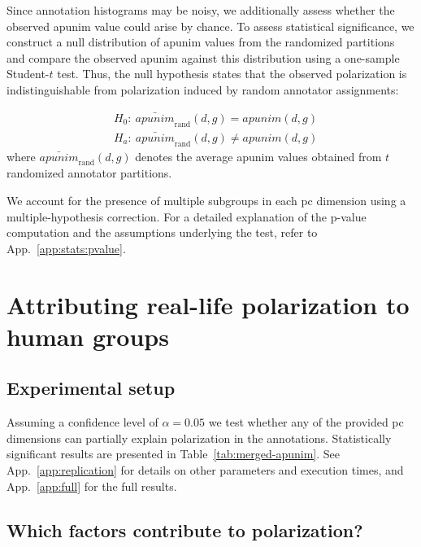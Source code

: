 \documentclass[11pt]{article}
\theoremstyle{definition}
\theoremstyle{plain}
\begin{document}
Since annotation histograms may be noisy, we additionally assess whether the observed apunim value could arise by chance. To assess statistical significance, we construct a null distribution of apunim values from the randomized partitions and compare the observed apunim against this distribution using a one-sample Student-\(t\) test. Thus, the null hypothesis states that the observed polarization is indistinguishable from polarization induced by random annotator assignments:

\begin{equation}
	\label{eq:pvalue}
	\begin{split}
		&H_0:\ 
		\bar{\textit{apunim}}_{\mathrm{rand}}(d,g)
		=
		\textit{apunim}(d,g) \\
		&H_a:\ 
		\bar{\textit{apunim}}_{\mathrm{rand}}(d,g)
		\neq
		\textit{apunim}(d,g)
	\end{split}
\end{equation}
\noindent where \(\bar{\textit{apunim}}_{\mathrm{rand}}(d,g)\) denotes the average apunim values obtained from $t$ randomized annotator partitions.

 We account for the presence of multiple subgroups in each \ac{pc} dimension using a multiple-hypothesis correction. For a detailed explanation of the p-value computation and the assumptions underlying the test, refer to App.~\ref{app:stats:pvalue}.


\section{Attributing real-life polarization to human groups}
\label{sec:results}

\subsection{Experimental setup}
\label{sec:results:experimental}

Assuming a confidence level of $\alpha=0.05$ we test whether any of the provided \ac{pc} dimensions can partially explain polarization in the annotations. Statistically significant results are presented in Table~\ref{tab:merged-apunim}. See App.~\ref{app:replication} for details on other parameters and execution times, and App.~\ref{app:full} for the full results.


\subsection{Which factors contribute to polarization?}
\label{ssec:results:factors}
\end{document}
